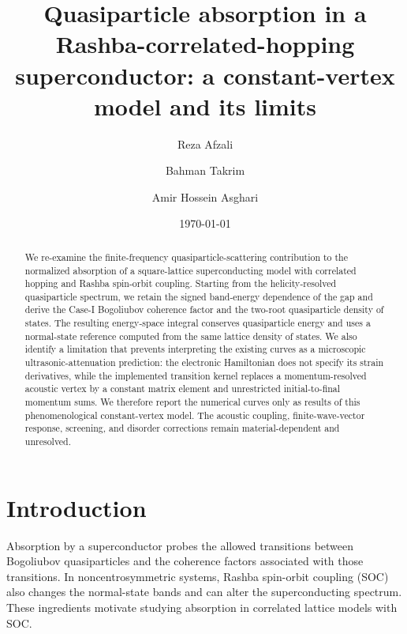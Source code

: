 \documentclass[aps,prb,preprint,superscriptaddress]{revtex4-2}
\begin{document}
\title{Quasiparticle absorption in a Rashba-correlated-hopping superconductor: a constant-vertex model and its limits}

\author{Reza Afzali}
\author{Bahman Takrim}
\author{Amir Hossein Asghari}

\date{\today}

\begin{abstract}
We re-examine the finite-frequency quasiparticle-scattering contribution to the normalized absorption of a square-lattice superconducting model with correlated hopping and Rashba spin-orbit coupling. Starting from the helicity-resolved quasiparticle spectrum, we retain the signed band-energy dependence of the gap and derive the Case-I Bogoliubov coherence factor and the two-root quasiparticle density of states. The resulting energy-space integral conserves quasiparticle energy and uses a normal-state reference computed from the same lattice density of states. We also identify a limitation that prevents interpreting the existing curves as a microscopic ultrasonic-attenuation prediction: the electronic Hamiltonian does not specify its strain derivatives, while the implemented transition kernel replaces a momentum-resolved acoustic vertex by a constant matrix element and unrestricted initial-to-final momentum sums. We therefore report the numerical curves only as results of this phenomenological constant-vertex model. The acoustic coupling, finite-wave-vector response, screening, and disorder corrections remain material-dependent and unresolved.
\end{abstract}

\maketitle

\section{Introduction}

Absorption by a superconductor probes the allowed transitions between Bogoliubov quasiparticles and the coherence factors associated with those transitions. In noncentrosymmetric systems, Rashba spin-orbit coupling (SOC) also changes the normal-state bands and can alter the superconducting spectrum. These ingredients motivate studying absorption in correlated lattice models with SOC.
\end{document}
